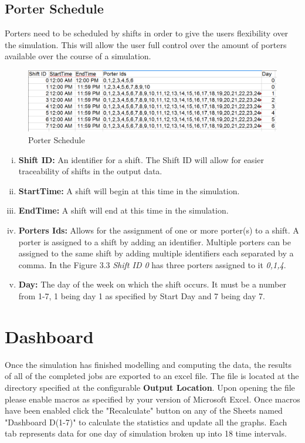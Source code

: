 \documentclass[paper=letter, fontsize=10pt]{scrartcl}
\numberwithin{equation}{section}		%
\numberwithin{figure}{section}			%
\numberwithin{table}{section}				%
\begin{document}
	\subsection{Porter Schedule}
	Porters need to be scheduled by shifts in order to give the users flexibility over the simulation.  This will allow the user full control over the amount of porters available over the course of a simulation.
	
	\begin{figure}[!htbp]
	\begin{center}
		\includegraphics[width=1\columnwidth, height=0.5\textheight, keepaspectratio]{Schedule.png}
		\caption{Porter Schedule}
	\end{center}
	\end{figure}
	
	\begin{enumerate}[(i)]
		\item \textbf{Shift ID:} An identifier for a shift.  The Shift ID will allow for easier traceability of shifts in the output data.
		\item \textbf{StartTime:} A shift will begin at this time in the simulation.
		\item \textbf{EndTime:} A shift will end at this time in the simulation.
		\item \textbf{Porters Ids:} Allows for the assignment of one or more porter(s) to a shift.  A porter is assigned to a shift by adding an identifier.  Multiple porters can be assigned to the same shift by adding multiple identifiers each separated by a comma.  In the Figure 3.3 \textit{Shift ID 0} has three  porters assigned to it \textit{0,1,4}.
		\item \textbf{Day:} The day of the week on which the shift occurs.  It must be a number from 1-7, 1 being day 1 as specified by Start Day and 7 being day 7.
	\end{enumerate}

\newpage
\section{Dashboard}
Once the simulation has finished modelling and computing the data, the results of all of the completed jobs are exported to an excel file. The file is located at the directory specified at the configurable \textbf{Output Location}. Upon opening the file please enable macros as specified by your version of Microsoft Excel. Once macros have been enabled click the "Recalculate" button on any of the Sheets named "Dashboard D(1-7)" to calculate the statistics and update all the graphs. Each tab represents data for one day of simulation broken up into 18 time intervals.
\end{document}
